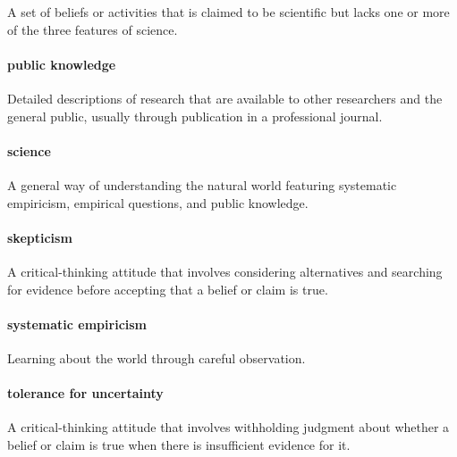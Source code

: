 \documentclass[
]{krantz}
\begin{document}
A set of beliefs or activities that is claimed to be scientific but lacks one or more of the three features of science.

\hypertarget{public-knowledge}{%
\paragraph*{public knowledge}\label{public-knowledge}}

Detailed descriptions of research that are available to other researchers and the general public, usually through publication in a professional journal.

\hypertarget{science}{%
\paragraph*{science}\label{science}}

A general way of understanding the natural world featuring systematic empiricism, empirical questions, and public knowledge.

\hypertarget{skepticism}{%
\paragraph*{skepticism}\label{skepticism}}

A critical-thinking attitude that involves considering alternatives and searching for evidence before accepting that a belief or claim is true.

\hypertarget{systematic-empiricism}{%
\paragraph*{systematic empiricism}\label{systematic-empiricism}}

Learning about the world through careful observation.

\hypertarget{tolerance-for-uncertainty}{%
\paragraph*{tolerance for uncertainty}\label{tolerance-for-uncertainty}}

A critical-thinking attitude that involves withholding judgment about whether a belief or claim is true when there is insufficient evidence for it.
\end{document}
